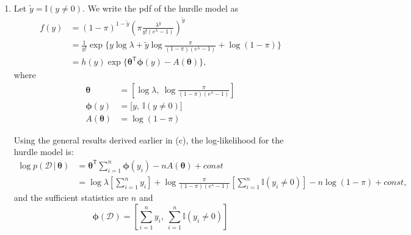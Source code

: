 \documentclass[submit]{harvardml}
\newcommand{\given}{\,|\,}
\newcommand{\trans}{\mathsf{T}}
\newcommand{\ident}{\mathbb{I}}
\begin{document}
\begin{enumerate}[label=(\alph*)]
	\item Let $\tilde{y} = \ident(y \neq 0)$. We write the pdf of the hurdle model as
	\begin{align*}
	f(y) 
	&= (1 - \pi)^{1-\tilde{y}} \left(\pi \frac{\lambda^y}{y! (e^{\lambda} - 1)}\right)^{\tilde{y}} \\
	&= \frac{1}{y!} \exp\bigg\{
	y\log\lambda + \tilde{y} \log\frac{\pi}{(1 - \pi)(e^{\lambda} - 1)}
	+ \log (1 - \pi) \bigg\} \\
	&= h(y) \exp\{\bm{\theta}^\trans\bm{\phi}(y) - A(\bm{\theta})\},
	\end{align*}
	where
	\begin{align*}
	\bm{\theta} &= \left[\log\lambda, \ \log\frac{\pi}{(1 - \pi)(e^{\lambda} - 1)}\right] \\
	\bm{\phi}(y) &= \big[y, \ \ident(y\neq 0)\big] \\
	A(\bm{\theta}) &= \log(1 - \pi)
	\end{align*}
	
	Using the general results derived earlier in (c), the log-likelihood for the hurdle model is:
	\begin{align*}
	\log p(\mathcal{D}\given\bm{\theta}) &= \bm{\theta}^\trans\sum_{i=1}^n\bm{\phi}(y_i) - nA(\bm{\theta}) + const \\
	&= 
	\log\lambda \left[\sum_{i=1}^n y_i\right]
	+ \log\frac{\pi}{(1 - \pi)(e^{\lambda} - 1)} \left[\sum_{i=1}^n \ident(y_i \neq 0)\right]
	- n\log(1 - \pi) + const,
	\end{align*}
	and the sufficient statistics are $n$ and
	\[
	\bm{\phi}(\mathcal{D}) = \left[
	\sum_{i=1}^n y_i, \
	\sum_{i=1}^n \ident(y_i \neq 0)
	\right]
	\]
\end{enumerate}
\end{document}

